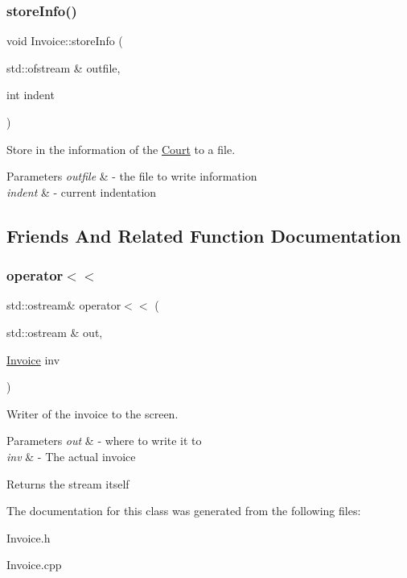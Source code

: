 \subsubsection{\texorpdfstring{store\+Info()}{storeInfo()}}
{\footnotesize\ttfamily void Invoice\+::store\+Info (\begin{DoxyParamCaption}\item[{std\+::ofstream \&}]{outfile,  }\item[{int}]{indent }\end{DoxyParamCaption})}



Store in the information of the \mbox{\hyperlink{class_court}{Court}} to a file. 


\begin{DoxyParams}{Parameters}
{\em outfile} & -\/ the file to write information \\
\hline
{\em indent} & -\/ current indentation \\
\hline
\end{DoxyParams}


\subsection{Friends And Related Function Documentation}
\mbox{\label{class_invoice_a1ff3da2cc7abd9df37b2936772ce9ff7}} 
\subsubsection{\texorpdfstring{operator$<$$<$}{operator<<}}
{\footnotesize\ttfamily std\+::ostream\& operator$<$$<$ (\begin{DoxyParamCaption}\item[{std\+::ostream \&}]{out,  }\item[{\mbox{\hyperlink{class_invoice}{Invoice}}}]{inv }\end{DoxyParamCaption})\hspace{0.3cm}{\ttfamily [friend]}}



Writer of the invoice to the screen. 


\begin{DoxyParams}{Parameters}
{\em out} & -\/ where to write it to \\
\hline
{\em inv} & -\/ The actual invoice \\
\hline
\end{DoxyParams}
\begin{DoxyReturn}{Returns}
the stream itself 
\end{DoxyReturn}


The documentation for this class was generated from the following files\+:\begin{DoxyCompactItemize}
\item 
Invoice.\+h\item 
Invoice.\+cpp\end{DoxyCompactItemize}
